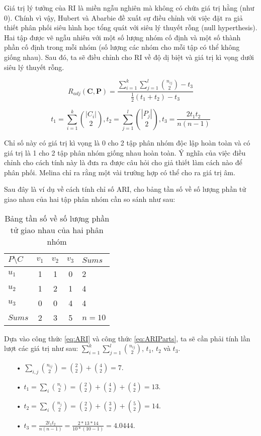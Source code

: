 Giá trị lý tưởng của RI là miền ngẫu nghiên mà không có chứa giá trị hằng (như $0$).
Chính vì vậy, Hubert và Abarbie đề xuất sự điều chỉnh với việc đặt ra giả thiết phân phối siêu hình học tổng quát với siêu lý thuyết rỗng (null hyperthesis).
Hai tập được vẽ ngẫu nhiên với một số lượng nhóm cố định và một số thành phần cố định trong mỗi nhóm (số lượng các nhóm cho mỗi tập có thể không giống nhau).
Sau đó, ta sẽ điều chỉnh cho RI về độ dị biệt và giá trị kì vọng dưới siêu lý thuyết rỗng.
\begin{center}
\begin{equation} \label{eq:ARI}
R_{adj}(\textbf{C}, \textbf{P}) = \frac{\sum^k_{i=1} \sum^l_{j=1} \binom {n_{ij}}  {2} - t_3}{\frac{1}{2} (t_1 + t_2) - t_3}
\end{equation}

\begin{equation} \label{eq:ARIParts}
t_1 = \sum^k_{i=1} \binom {|C_i|} {2} , t_2 = \sum_{j=1}^l \binom {|P_j|} {2}, t_3 = \frac{2 t_1 t_2}{n (n - 1)}
\end{equation}
\end{center}

Chỉ số này có giá trị kì vọng là 0 cho 2 tập phân nhóm độc lập hoàn toàn và có giá trị là 1 cho 2 tập phân nhóm giống nhau hoàn toàn.
Ý nghĩa của việc điều chỉnh cho cách tính này là đưa ra được câu hỏi cho giả thiết làm cách nào để phân phối.
Melina chỉ ra rằng một vài trường hợp có thể cho ra giá trị âm\cite{Melina-ARI}.

Sau đây là ví dụ về cách tính chỉ số ARI, cho bảng tần số về số lượng phần tử giao nhau của hai tập phân nhóm cần so sánh như sau:
\begin{table}[ht]
\begin{center}
\begin{tabular}{l|c c c|l}
\hline
$P \setminus C$ & $v_1$ & $v_2$ & $v_3$ & $Sums$ \\
\hline
$u_1$ & 1 & 1 & 0 & 2 \\
$u_2$ & 1 & 2 & 1 & 4 \\
$u_3$ & 0 & 0 & 4 & 4 \\
\hline
$Sums$ & 2 & 3 & 5 & $n = 10$ \\
\end{tabular}
\caption[Bảng tần số]{Bảng tần số về số lượng phần tử giao nhau của hai phân nhóm}
\label{bang_4_5}
\end{center}
\end{table}

Dựa vào công thức \ref{eq:ARI} và công thức \ref{eq:ARIParts}, ta sẽ cần phải tính lần lượt các giá trị như sau: $\sum^k_{i=1} \sum^l_{j=1} \binom {n_{ij}}{2}$, $t_1$, $t_2$ và $t_3$.
\begin{enumerate}
\item[•]$\sum_{i,j} \binom {n_{ij}}{2} = \binom {2}{2} + \binom {4}{2} = 7$.
\item[•]$t_1 = \sum_{i} \binom {n_i}{2} = \binom {2}{2} + \binom {4}{2} + \binom {4}{2} = 13$.
\item[•]$t_2 = \sum_{i} \binom {n_j}{2} = \binom {2}{2} + \binom {3}{2} + \binom {5}{2} = 14$.
\item[•]$t_3 = \frac{2 t_1 t_2}{n (n - 1)} = \frac{2 * 13 * 14}{10 * (10 - 1)} = 4.0444$.
\end{enumerate}

